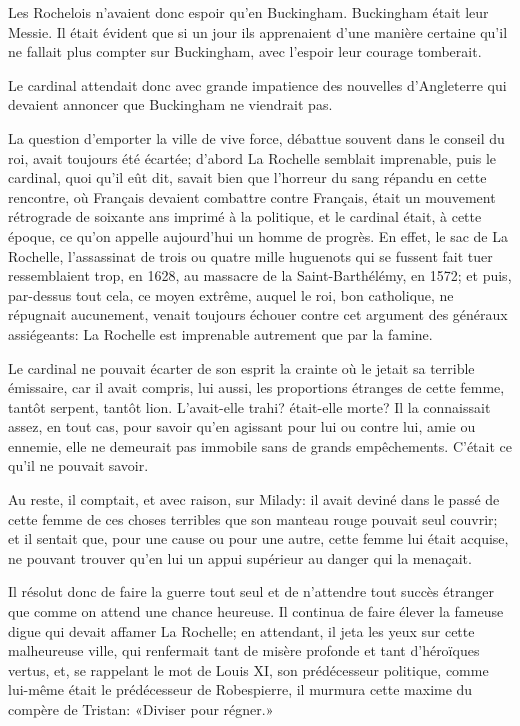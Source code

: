 Les Rochelois n'avaient donc espoir qu'en Buckingham. Buckingham était leur Messie. Il était évident que si un jour ils apprenaient d'une manière certaine qu'il ne fallait plus compter sur Buckingham, avec l'espoir leur courage tomberait. 

Le cardinal attendait donc avec grande impatience des nouvelles d'Angleterre qui devaient annoncer que Buckingham ne viendrait pas. 

La question d'emporter la ville de vive force, débattue souvent dans le conseil du roi, avait toujours été écartée; d'abord La Rochelle semblait imprenable, puis le cardinal, quoi qu'il eût dit, savait bien que l'horreur du sang répandu en cette rencontre, où Français devaient combattre contre Français, était un mouvement rétrograde de soixante ans imprimé à la politique, et le cardinal était, à cette époque, ce qu'on appelle aujourd'hui un homme de progrès. En effet, le sac de La Rochelle, l'assassinat de trois ou quatre mille huguenots qui se fussent fait tuer ressemblaient trop, en 1628, au massacre de la Saint-Barthélémy, en 1572; et puis, par-dessus tout cela, ce moyen extrême, auquel le roi, bon catholique, ne répugnait aucunement, venait toujours échouer contre cet argument des généraux assiégeants: La Rochelle est imprenable autrement que par la famine. 

Le cardinal ne pouvait écarter de son esprit la crainte où le jetait sa terrible émissaire, car il avait compris, lui aussi, les proportions étranges de cette femme, tantôt serpent, tantôt lion. L'avait-elle trahi? était-elle morte? Il la connaissait assez, en tout cas, pour savoir qu'en agissant pour lui ou contre lui, amie ou ennemie, elle ne demeurait pas immobile sans de grands empêchements. C'était ce qu'il ne pouvait savoir. 

Au reste, il comptait, et avec raison, sur Milady: il avait deviné dans le passé de cette femme de ces choses terribles que son manteau rouge pouvait seul couvrir; et il sentait que, pour une cause ou pour une autre, cette femme lui était acquise, ne pouvant trouver qu'en lui un appui supérieur au danger qui la menaçait. 

Il résolut donc de faire la guerre tout seul et de n'attendre tout succès étranger que comme on attend une chance heureuse. Il continua de faire élever la fameuse digue qui devait affamer La Rochelle; en attendant, il jeta les yeux sur cette malheureuse ville, qui renfermait tant de misère profonde et tant d'héroïques vertus, et, se rappelant le mot de Louis XI, son prédécesseur politique, comme lui-même était le prédécesseur de Robespierre, il murmura cette maxime du compère de Tristan: «Diviser pour régner.» 

